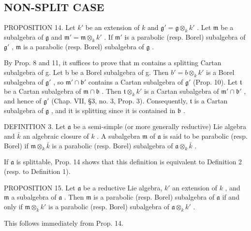 \subsection{NON-SPLIT CASE}

PROPOSITION 14. Let \(k'\) be an extension of \(k\) and \(\mathfrak{g}' = \mathfrak{g} \otimes_k k'\) . Let \(\mathfrak{m}\) be a subalgebra of \(\mathfrak{g}\) and \(\mathfrak{m}' = \mathfrak{m} \otimes_k k'\) . If \(\mathfrak{m}'\) is a parabolic (resp. Borel) subalgebra of \(\mathfrak{g}'\) , \(\mathfrak{m}\) is a parabolic (resp. Borel) subalgebra of \(\mathfrak{g}\) .

By Prop. 8 and 11, it suffices to prove that m contains a splitting Cartan subalgebra of g. Let b be a Borel subalgebra of g. Then \(b' = b \otimes_{k} k'\) is a Borel subalgebra of \(\mathfrak{g}'\) , so \(\mathfrak{m}' \cap \mathfrak{b}'\) contains a Cartan subalgebra of \(\mathfrak{g}'\) (Prop. 10). Let \(\mathfrak{t}\) be a Cartan subalgebra of \(\mathfrak{m} \cap \mathfrak{b}\) . Then \(\mathfrak{t} \otimes_k k'\) is a Cartan subalgebra of \(\mathfrak{m}' \cap \mathfrak{b}'\) , and hence of \(\mathfrak{g}'\) (Chap. VII, §3, no. 3, Prop. 3). Consequently, \(\mathfrak{t}\) is a Cartan subalgebra of \(\mathfrak{g}\) , and it is splitting since it is contained in \(\mathfrak{b}\) .

DEFINITION 3. Let \(\mathfrak{a}\) be a semi-simple (or more generally reductive) Lie algebra and \(\bar{k}\) an algebraic closure of \(k\) . A subalgebra \(\mathfrak{m}\) of \(\mathfrak{a}\) is said to be parabolic (resp. Borel) if \(\mathfrak{m} \otimes_k \bar{k}\) is a parabolic (resp. Borel) subalgebra of \(\mathfrak{a} \otimes_k \bar{k}\) .

If \(\mathfrak{a}\) is splittable, Prop. 14 shows that this definition is equivalent to Definition 2 (resp. to Definition 1).

PROPOSITION 15. Let \(\mathfrak{a}\) be a reductive Lie algebra, \(k'\) an extension of \(k\) , and \(\mathfrak{m}\) a subalgebra of \(\mathfrak{a}\) . Then \(\mathfrak{m}\) is a parabolic (resp. Borel) subalgebra of \(\mathfrak{a}\) if and only if \(\mathfrak{m} \otimes_k k'\) is a parabolic (resp. Borel) subalgebra of \(\mathfrak{a} \otimes_k k'\) .

This follows immediately from Prop. 14.

